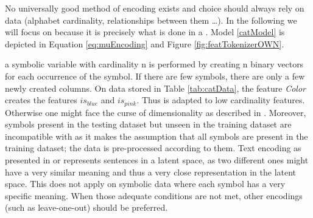 

No universally good method of encoding exists and choice should always rely on data (alphabet cardinality, relationships between them \dots). In the following we will focus on \ohe because it is precisely what is done in a \catmod. Model \ref{catModel} \ohe is depicted in Equation \ref{eq:muEncoding} and Figure \ref{fig:featTokenizerOWN}.


\ohe a symbolic variable with cardinality n is performed by creating n binary vectors for each occurrence of the symbol. If there are few symbols, there are only a few newly created columns. On data stored in Table \ref{tab:catData}, \ohe the feature \textit{Color} creates the features $is_{blue}$ and $is_{pink}$. Thus \ohe is adapted to low cardinality features. Otherwise one might face the curse of dimensionality as described in \cite{curse}. Moreover, symbols present in the testing dataset but unseen in the training dataset are incompatible with \ohe as it makes the assumption that all symbols are present in the training dataset; the data is pre-processed according to them. Text encoding as presented in \cite{sundae} or \cite{textClassification} represents sentences in a latent space, as two different ones might have a very similar meaning and thus a very close representation in the latent space. This does not apply on symbolic data where each symbol has a very specific meaning.
When those adequate conditions are not met, other encodings (such as leave-one-out) should be preferred. 


